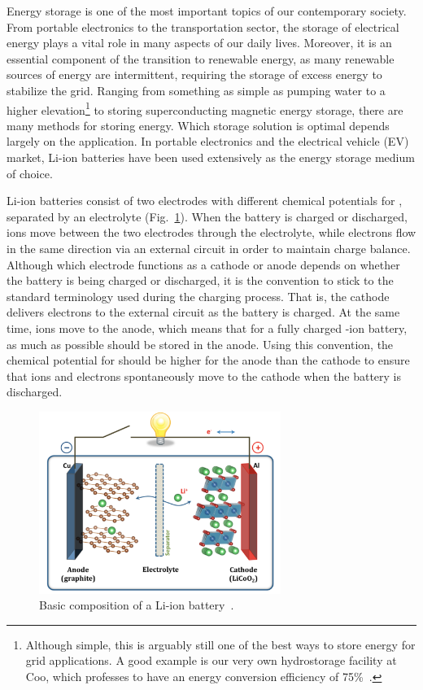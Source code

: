 \begin{refsection}
Energy storage is one of the most important topics of our contemporary 
society. From portable electronics to the transportation sector, the storage 
of electrical energy plays a vital role in many aspects of our daily lives. 
Moreover, it is an essential component of the transition to renewable energy, 
as many renewable sources of energy are intermittent, requiring the storage of 
excess energy to stabilize the grid. Ranging from something as simple as 
pumping water to a higher elevation\footnote{Although simple, this is arguably 
still one of the best ways to store energy for grid applications. A good 
example is our very own hydrostorage facility at Coo, which professes to have 
an energy conversion efficiency of 75\%~\cite{Engie-Electrabel2015}.} to 
storing superconducting magnetic energy storage, there are many methods for 
storing energy. Which storage solution is optimal depends largely on the 
application. In portable electronics and the electrical vehicle (EV) market, 
Li-ion batteries have been used extensively as the energy storage medium of 
choice. 
 
Li-ion batteries consist of two electrodes with different chemical potentials 
for , separated by an electrolyte (Fig.~\ref{batteries:fig-li_ion}). 
When the battery is charged or discharged,  ions move between the two 
electrodes through the electrolyte, while electrons flow in the same direction 
via an external circuit in order to maintain charge balance. Although which 
electrode functions as a cathode or anode depends on whether the battery is 
being charged or discharged, it is the convention to stick to the standard 
terminology used during the charging process. That is, the cathode delivers 
electrons to the external circuit as the battery is charged. At the same time, 
 ions move to the anode, which means that for a fully charged 
-ion battery, as much  as possible should be stored in the 
anode. Using this convention, the chemical potential for  should be 
higher for the anode than the cathode to ensure that  ions and 
electrons spontaneously move to the cathode when the battery is discharged. 
 
\begin{figure}[ht] 
\centering 
\captionsetup{width=0.8\linewidth}
\includegraphics[width=0.7\textwidth]{./figures/batteries/li-ion_battery.png} 
\caption{Basic composition of a Li-ion battery~\cite{Goodenough2013}.} 
\label{batteries:fig-li_ion} 
\end{figure}
 

\end{refsection}

